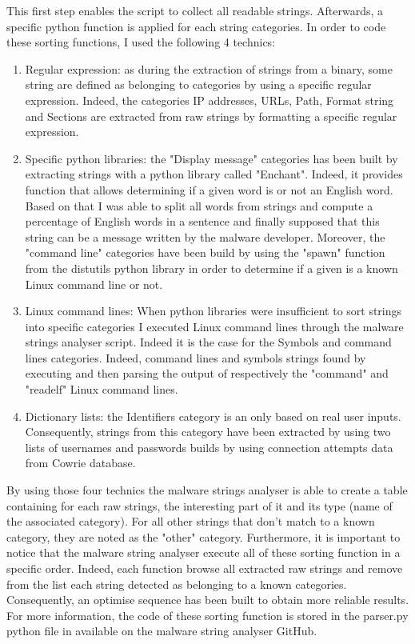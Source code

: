 This first step enables the script to collect all readable strings. Afterwards, a specific 
python function is applied for each string categories.
In order to code these sorting functions, I used the following 4 technics:
\begin{enumerate}
  \item Regular expression: as during the extraction of strings from a binary, some string
  are defined as belonging to categories by using a specific regular expression.
  Indeed, the categories IP addresses, URLs, Path, Format string and Sections are extracted
  from raw strings by formatting a specific regular expression.
  \item Specific python libraries: the "Display message" categories has been built by extracting
  strings with a python library called "Enchant". Indeed, it provides function that allows determining if a given word is or not an English word. Based on that I was able to split all
  words from strings and compute a percentage of English words in a sentence and finally
  supposed that this string can be a message written by the malware developer. Moreover, 
  the "command line" categories have been build by using the "spawn" function from the distutils
  python library in order to determine if a given is a known Linux command line or not.
  \item Linux command lines: When python libraries were insufficient to sort strings into specific categories I executed Linux command lines through the malware strings analyser
  script. Indeed it is the case for the Symbols and command lines categories. Indeed, command 
  lines and symbols strings found by executing and then parsing the output of respectively
  the "command" and "readelf" Linux command lines.
  \item Dictionary lists: the Identifiers category is an only based on real user inputs.
  Consequently, strings from this category have been extracted by using two lists of usernames
  and passwords builds by using connection attempts data from Cowrie database.
\end{enumerate}

By using those four technics the malware strings analyser is able to create a table containing
for each raw strings, the interesting part of it and its type (name of the associated category).
For all other strings that don't match to a known category, they are noted as the "other" category.
Furthermore, it is important to notice that the malware string analyser execute all of these 
sorting function in a specific order. Indeed, each function browse all extracted raw strings
and remove from the list each string detected as belonging to a known categories.
Consequently, an optimise sequence has been built to obtain more reliable results.
For more information, the code of these sorting function is stored in the parser.py python
file in available on the malware string analyser GitHub.

